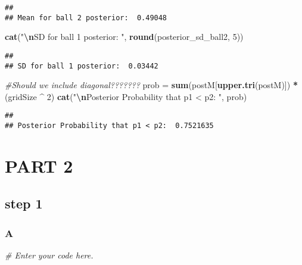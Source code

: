 \documentclass[
]{article}
\newenvironment{Shaded}{\begin{snugshade}}{\end{snugshade}}
\newcommand{\CommentTok}[1]{\textcolor[rgb]{0.56,0.35,0.01}{\textit{#1}}}
\newcommand{\DecValTok}[1]{\textcolor[rgb]{0.00,0.00,0.81}{#1}}
\newcommand{\FunctionTok}[1]{\textcolor[rgb]{0.13,0.29,0.53}{\textbf{#1}}}
\newcommand{\NormalTok}[1]{#1}
\newcommand{\OtherTok}[1]{\textcolor[rgb]{0.56,0.35,0.01}{#1}}
\newcommand{\SpecialCharTok}[1]{\textcolor[rgb]{0.81,0.36,0.00}{\textbf{#1}}}
\newcommand{\StringTok}[1]{\textcolor[rgb]{0.31,0.60,0.02}{#1}}
\begin{document}
\begin{verbatim}
## 
## Mean for ball 2 posterior:  0.49048
\end{verbatim}

\begin{Shaded}
\begin{Highlighting}[]
\FunctionTok{cat}\NormalTok{(}\StringTok{"}\SpecialCharTok{\textbackslash{}n}\StringTok{SD for ball 1 posterior: "}\NormalTok{, }\FunctionTok{round}\NormalTok{(posterior\_sd\_ball2, }\DecValTok{5}\NormalTok{))}
\end{Highlighting}
\end{Shaded}

\begin{verbatim}
## 
## SD for ball 1 posterior:  0.03442
\end{verbatim}

\begin{Shaded}
\begin{Highlighting}[]
\CommentTok{\#Should we include diagonal???????}
\NormalTok{prob }\OtherTok{=} \FunctionTok{sum}\NormalTok{(postM[}\FunctionTok{upper.tri}\NormalTok{(postM)]) }\SpecialCharTok{*}\NormalTok{ (gridSize }\SpecialCharTok{\^{}} \DecValTok{2}\NormalTok{) }
\FunctionTok{cat}\NormalTok{(}\StringTok{"}\SpecialCharTok{\textbackslash{}n}\StringTok{Posterior Probability that p1 \textless{} p2: "}\NormalTok{, prob)}
\end{Highlighting}
\end{Shaded}

\begin{verbatim}
## 
## Posterior Probability that p1 < p2:  0.7521635
\end{verbatim}

\hypertarget{part-2}{%
\section{PART 2}\label{part-2}}

\hypertarget{step-1}{%
\subsection{step 1}\label{step-1}}

\hypertarget{a}{%
\subsubsection{A}\label{a}}

\begin{Shaded}
\begin{Highlighting}[]
\CommentTok{\# Enter your code here.}
\end{Highlighting}
\end{Shaded}
\end{document}
